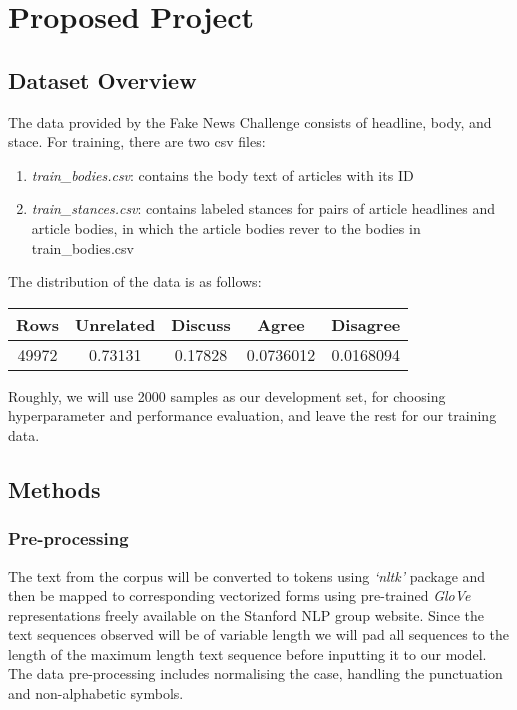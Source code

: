 \documentclass[12pt]{article}
\begin{document}
\section{Proposed Project}
\subsection{Dataset Overview}

The data provided by the Fake News Challenge consists of 
headline, body, and stace. 
For training, there are two csv files:
\begin{enumerate}
  \item \textit{train\_bodies.csv}: contains the body text of articles with its ID
  \item \textit{train\_stances.csv}: contains labeled stances for pairs of article 
      headlines and article bodies, in which the article bodies rever to the 
      bodies in train\_bodies.csv
\end{enumerate}

The distribution of the data is as follows:
\begin{center}
  \begin{tabular} 
    {|c|c|c|c|c|}
    \hline
    Rows & Unrelated & Discuss & Agree & Disagree \\
    \hline
    49972 & 0.73131 & 0.17828 & 0.0736012 & 0.0168094 \\
    \hline
  \end{tabular}
\end{center}
Roughly, we will use 2000 samples as our development set, for choosing 
hyperparameter and performance evaluation, and leave the rest for 
our training data. 

\subsection{Methods}
\subsubsection{Pre-processing}

The text from the corpus will be converted to tokens using \textit{‘nltk’} package and 
then be mapped to corresponding vectorized forms using  pre-trained \textit{GloVe} 
representations freely available on the Stanford NLP group website. 
Since the text sequences observed will be of variable length we will pad all 
sequences to the length of the maximum length text sequence before inputting 
it to our model. The data pre-processing includes normalising the case, handling the punctuation
and non-alphabetic symbols.
\end{document}

